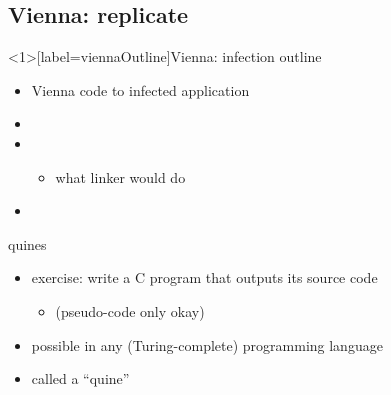 \subsection{Vienna: replicate}

\begin{frame}<1>[label=viennaOutline]{Vienna: infection outline}
\begin{itemize}
\item Vienna  code to infected application
\vspace{.5cm}
\item {}
\item {}
    \begin{itemize}\item what linker would do\end{itemize}
\item {}
\end{itemize}
\end{frame}


\begin{frame}{quines}
\begin{itemize}
    \item exercise: write a C program that outputs its source code
        \begin{itemize}
        \item (pseudo-code only okay)
        \end{itemize}
    \item possible in any {\small (Turing-complete)} programming language
    \item called a ``quine''
\end{itemize}
\end{frame}

